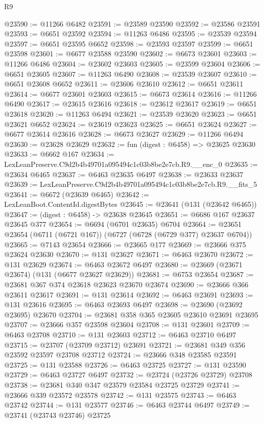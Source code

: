 \begin{lexlean}{R9}
\begin{coremodule}
@23590 := @11266 @6482
@23591 := @23589 @23590
@23592 := @23586 @23591
@23593 := @6651 @23592
@23594 := @11263 @6486
@23595 := @23539 @23594
@23597 := @6651 @23595 @6652
@23598 := @23593 @23597
@23599 := @6651 @23598
@23601 := @6677 @23588 @23590
@23602 := @6673 @23601
@23603 := @11266 @6486
@23604 := @23602 @23603
@23605 := @23599 @23604
@23606 := @6651 @23605
@23607 := @11263 @6490
@23608 := @23539 @23607
@23610 := @6651 @23608 @6652
@23611 := @23606 @23610
@23612 := @6651 @23611
@23614 := @6677 @23601 @23603
@23615 := @6673 @23614
@23616 := @11266 @6490
@23617 := @23615 @23616
@23618 := @23612 @23617
@23619 := @6651 @23618
@23620 := @11263 @6494
@23621 := @23539 @23620
@23623 := @6651 @23621 @6652
@23624 := @23619 @23623
@23625 := @6651 @23624
@23627 := @6677 @23614 @23616
@23628 := @6673 @23627
@23629 := @11266 @6494
@23630 := @23628 @23629
@23632 := fun (digest : @6458) => @23625 @23630
@23633 := @6662 @167
@23634 := LexLeanPreserve.C9d2b4b49701a095494c1c03b8be2e7cb.R9.__enc_0
@23635 := @23634 @6465
@23637 := @6463 @23635 @6497
@23638 := @23633 @23637
@23639 := LexLeanPreserve.C9d2b4b49701a095494c1c03b8be2e7cb.R9.__fits_5
@23641 := @6672 (@23639 @6465)
@23642 := LexLeanBoot.ContentId.digestBytes
@23645 := @23641 (@131 (@23642 @6465))
@23647 := (digest : @6458) -> @23638 @23645
@23651 := @6686 @167 @23637 @23645 @377
@23654 := @6694 (@6701 @23635) @6704
@23664 := @23651 @23654 (@6711 (@6721 @167)) (@6727 (@6728 (@6729 @377) @23637 @6704))
@23665 := @7143 @23654
@23666 := @23665 @177
@23669 := @23666 @375 @23624 @23630
@23670 := @131 @23627
@23671 := @6463 @23670
@23672 := @131 @23629
@23674 := @6463 @23672 @6497
@23680 := @23669 (@23671 @23674) (@131 (@6677 @23627 @23629))
@23681 := @6753 @23654
@23687 := @23681 @367 @374 @23618 @23623 @23670 @23674
@23690 := @23666 @366 @23611 @23617
@23691 := @131 @23614
@23692 := @6463 @23691
@23693 := @131 @23616
@23695 := @6463 @23693 @6497
@23698 := @23690 (@23692 @23695) @23670
@23704 := @23681 @358 @365 @23605 @23610 @23691 @23695
@23707 := @23666 @357 @23598 @23604
@23708 := @131 @23601
@23709 := @6463 @23708
@23710 := @131 @23603
@23712 := @6463 @23710 @6497
@23715 := @23707 (@23709 @23712) @23691
@23721 := @23681 @349 @356 @23592 @23597 @23708 @23712
@23724 := @23666 @348 @23585 @23591
@23725 := @131 @23588
@23726 := @6463 @23725
@23727 := @131 @23590
@23729 := @6463 @23727 @6497
@23732 := @23724 (@23726 @23729) @23708
@23738 := @23681 @340 @347 @23579 @23584 @23725 @23729
@23741 := @23666 @339 @23572 @23578
@23742 := @131 @23575
@23743 := @6463 @23742
@23744 := @131 @23577
@23746 := @6463 @23744 @6497
@23749 := @23741 (@23743 @23746) @23725

\end{coremodule}
\end{lexlean}
